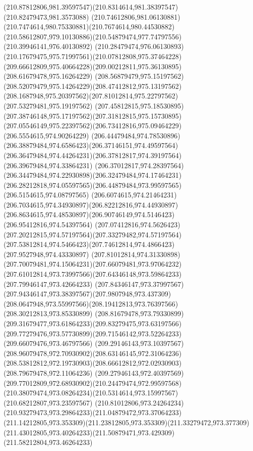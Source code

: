 {{\curveto(210.87812806,981.39597547)(210.8314614,981.38397547)(210.82479473,981.3573088)
\curveto(210.74612806,981.06130881)(210.7474614,980.75330881)(210.7674614,980.44530882)
\curveto(210.58612807,979.10130886)(210.54879474,977.74797556)(210.39946141,976.40130892)
\curveto(210.28479474,976.06130893)(210.17679475,975.71997561)(210.07812808,975.37464228)
\curveto(209.66612809,975.40664228)(209.00212811,975.36130895)(208.61679478,975.16264229)
\curveto(208.56879479,975.15197562)(208.52079479,975.14264229)(208.47412812,975.13197562)
\curveto(208.1687948,975.20397562)(207.81012814,975.22797562)(207.53279481,975.19197562)
\curveto(207.45812815,975.18530895)(207.38746148,975.17197562)(207.31812815,975.15730895)
\curveto(207.05546149,975.22397562)(206.73412816,975.09464229)(206.5554615,974.90264229)
\curveto(206.44479484,974.78530896)(206.38879484,974.6586423)(206.37146151,974.49597564)
\curveto(206.36479484,974.44264231)(206.37812817,974.39197564)(206.39679484,974.33864231)
\curveto(206.37012817,974.28397564)(206.34479484,974.22930898)(206.32479484,974.17464231)
\curveto(206.28212818,974.05597565)(206.44879484,973.99597565)(206.5154615,974.08797565)
\curveto(206.6074615,974.21464231)(206.7034615,974.34930897)(206.82212816,974.44930897)
\curveto(206.8634615,974.48530897)(206.90746149,974.5146423)(206.95412816,974.54397564)
\curveto(207.07412816,974.5626423)(207.20212815,974.57197564)(207.33279482,974.57197564)
\curveto(207.53812814,974.5466423)(207.74612814,974.4866423)(207.9527948,974.43330897)
\curveto(207.81012814,974.31330898)(207.70079481,974.15064231)(207.66079481,973.97064232)
\curveto(207.61012814,973.73997566)(207.64346148,973.59864233)(207.79946147,973.42664233)
\curveto(207.84346147,973.37997567)(207.94346147,973.38397567)(207.9807948,973.437309)
\curveto(208.0647948,973.55997566)(208.19412813,973.76397566)(208.30212813,973.85330899)
\curveto(208.81679478,973.79330899)(209.31679477,973.61864233)(209.83279475,973.63197566)
\curveto(209.77279476,973.57730899)(209.71546142,973.52264233)(209.66079476,973.46797566)
\curveto(209.29146143,973.10397567)(208.96079478,972.70930902)(208.63146145,972.31064236)
\curveto(208.53812812,972.19730903)(208.66612812,972.02930903)(208.79679478,972.11064236)
\curveto(209.27946143,972.40397569)(209.77012809,972.68930902)(210.24479474,972.99597568)
\curveto(210.38079474,973.08264234)(210.5314614,973.15997567)(210.68212807,973.23597567)
\curveto(210.81012806,973.24264234)(210.93279473,973.29864233)(211.04879472,973.37064233)
\curveto(211.14212805,973.353309)(211.23812805,973.353309)(211.33279472,973.377309)
\curveto(211.43012805,973.40264233)(211.50879471,973.429309)(211.58212804,973.46264233)
}}
